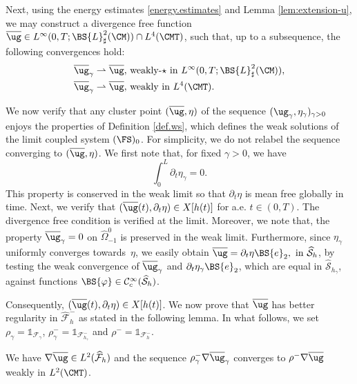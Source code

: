 Next, using the energy estimates \eqref{energy.estimates} and Lemma \ref{lem:extension-u}, we may construct a divergence free function $\overline{\ug}\in L^{\infty}(0,T;\BS{L}^{2}_{\sharp}(\CM))\cap L^{4}(\CMT)$, such that, up to a subsequence, the following convergences hold:
\[
\begin{split}
\overline{\ug}_{\gamma}\rightharpoonup\overline{\ug},& \text{ weakly-$\star$ in }L^{\infty}(0,T;\BS{L}^{2}_{\sharp}(\CM)),\\
\overline{\ug}_{\gamma}\rightharpoonup\overline{\ug},&\text{ weakly in } L^{4}(\CMT).
\end{split}
\]

We now verify that any cluster point $(\overline{\ug}, \eta)$ of the sequence $(\ug_{\gamma},\eta_{\gamma})_{\gamma >0}$ enjoys the properties of Definition \ref{def.ws}, which defines the weak solutions of the limit coupled system $(\FS)_0$. For simplicity, we do not relabel the sequence converging to $(\overline{\ug}, \eta)$. We first note that, for fixed $\gamma >0$, we have
\[
\int_0^L \partial_t\eta_{\gamma}=0.
\]
This property is conserved in the weak limit so that $\partial_t\eta$ is mean free globally in time. Next, we verify that $(\overline{\ug}(t),\partial_t \eta) \in X[h(t)]$ for a.e. $t \in (0,T)$. The divergence free condition is verified at the limit. Moreover, we note that,
the property $\overline{\ug}_{\gamma} = 0$ on $\widehat{\Omega}_{-1}^0$ is preserved in the weak limit. Furthermore, since $\eta_\gamma$ uniformly converges towards~$\eta$, we easily obtain $\overline{\ug} =\partial_{t}\eta\BS{e}_2,\text{ in }\widehat{\mathcal{S}}_{h}$, by testing the weak convergence of $ \overline{\ug}_{\gamma}$ and $ \partial_{t}\eta_\gamma\BS{e}_2$, which are equal in $\widehat{\mathcal S}_{h_\gamma}$, against
functions $\BS{\varphi} \in \mathcal C^{\infty}_c(\widehat{\mathcal S}_h)$.

Consequently, $(\overline{\ug}(t),\partial_t \eta) \in X[h(t)]$. We now prove that $\overline{\ug}$ has better regularity in $\widehat{\mathcal F}^-_{h}$ as stated in the following lemma. In what follows, we set $\rho_{\gamma}=\mathds{1}_{\mathcal{F}_{\gamma}}$, $\rho_{\gamma}^{-}=\mathds{1}_{\mathcal{F}_{h_{\gamma}}^{-}}$ and $\rho^{-}=\mathds{1}_{\mathcal{F}_{h}^{-}}$.

\begin{lemma}\label{lemma.gradient}
We have $\nabla \overline{\ug} \in L^2(\widehat{\mathcal F}_h)$ and the sequence $\rho_\gamma^-\nabla \overline{\ug}_{\gamma}$ converges to $\rho^-\nabla \overline{\ug}$ weakly in $L^{2}(\CMT)$.
\end{lemma}


